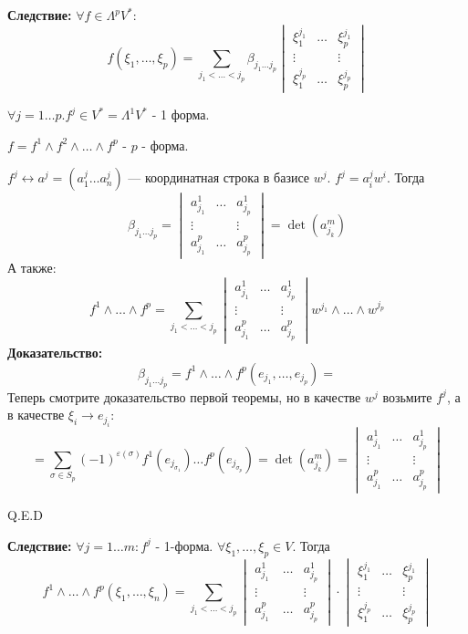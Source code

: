 \textbf{Следствие:} $\forall f \in \Lambda^p V^*$:
$$f(\xi_1, \ldots,\xi_p)=\sum\limits_{j_1<\ldots<j_p}\beta_{j_1\ldots j_p} \begin{vmatrix}
\xi_1^{j_1}&\ldots& \xi_p^{j_1}\\
\vdots & & \vdots \\
\xi_1^{j_p} & \ldots & \xi_p^{j_p}
\end{vmatrix}$$


$\forall j = 1\ldots p. f^j \in V^* = \Lambda^1V^*$ - 1 форма.

$f= f^1 \wedge f^2 \wedge \ldots \wedge f^p$ - $p$ - форма.

$f^j \leftrightarrow a^j = (a_1^j \ldots a_n^j)$ --- координатная строка в базисе $w^j$. $f^j= a_i^j w^i$. Тогда
$$\beta_{j_1\ldots j_p}= \begin{vmatrix}
    a_{j_1}^1 & \ldots & a_{j_p}^{1}\\
    \vdots & & \vdots \\
    a_{j_1}^p & \ldots & a_{j_p}^p
\end{vmatrix} = \det (a_{j_k}^m)$$
А также:
$$f^1 \wedge \ldots \wedge f^p = \sum\limits_{j_1 < \ldots < j_p}\begin{vmatrix}
    a_{j_1}^1 & \ldots & a_{j_p}^1 \\
    \vdots & & \vdots \\
    a^p_{j_1} & \ldots & a_{j_p}^p
\end{vmatrix} w^{j_1}\wedge \ldots \wedge w^{j_p}$$
\textbf{Доказательство:}
$$\beta_{j_1\ldots j_p}= f^1\wedge \ldots \wedge f^p (e_{j_1},\ldots, e_{j_p})=$$
Теперь смотрите доказательство первой теоремы, но в качестве $w^j$ возьмите $f^j$, а в качестве $\xi_i \rightarrow e_{j_i}$:
$$= \sum\limits_{\sigma \in S_p} (-1)^{\varepsilon(\sigma)}f^1(e_{j_{\sigma_1}})\ldots f^p(e_{j_{\sigma_p}}) = \det (a_{j_{k}}^m) = \begin{vmatrix}
    a_{j_1}^1 & \ldots & a_{j_p}^1\\
    \vdots & & \vdots \\
    a_{j_1}^p & \ldots & a_{j_p}^p
\end{vmatrix} $$

\hfill Q.E.D


\textbf{Следствие:} $\forall j = 1\ldots m: f^j$ - 1-форма. $\forall \xi_1,\ldots, \xi_p \in V$. Тогда
$$f^1 \wedge \ldots \wedge f^p (\xi_1,\ldots, \xi_n) = \sum\limits_{j_1 < \ldots < j_p} \begin{vmatrix} a_{j_1}^1\ & \ldots & a_{j_p}^1 \\
\vdots & & \vdots \\
a_{j_1}^p & \ldots & a_{j_p}^{p}
\end{vmatrix}\cdot \begin{vmatrix}
\xi_1^{j_1} & \ldots & \xi_p^{j_1}\\
\vdots & & \vdots \\
\xi_{1}^{j_p} & \ldots  &  \xi_p^{j_p}
\end{vmatrix}$$

